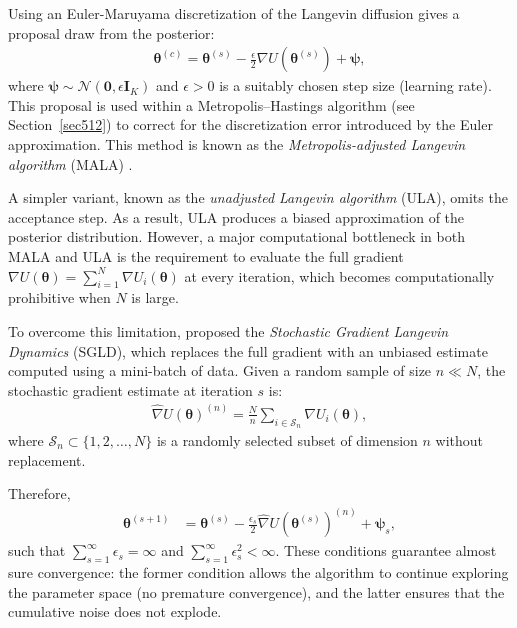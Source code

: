 Using an Euler-Maruyama discretization of the Langevin diffusion gives a proposal draw from the posterior:
\begin{align*}
	\boldsymbol{\theta}^{(c)} = \boldsymbol{\theta}^{(s)} - \frac{\epsilon}{2} \nabla U(\boldsymbol{\theta}^{(s)}) + \boldsymbol{\psi},
\end{align*}
where \( \boldsymbol{\psi} \sim \mathcal{N}(\mathbf{0}, \epsilon \mathbf{I}_K) \) and \( \epsilon > 0 \) is a suitably chosen step size (learning rate). This proposal is used within a Metropolis–Hastings algorithm (see Section~\ref{sec512}) to correct for the discretization error introduced by the Euler approximation. This method is known as the \textit{Metropolis-adjusted Langevin algorithm} (MALA) \cite{roberts1996exponential}. 

A simpler variant, known as the \textit{unadjusted Langevin algorithm} (ULA), omits the acceptance step. As a result, ULA produces a biased approximation of the posterior distribution. However, a major computational bottleneck in both MALA and ULA is the requirement to evaluate the full gradient \( \nabla U(\boldsymbol{\theta}) = \sum_{i=1}^N \nabla U_i(\boldsymbol{\theta}) \) at every iteration, which becomes computationally prohibitive when \( N \) is large.

To overcome this limitation, \cite{welling2011bayesian} proposed the \textit{Stochastic Gradient Langevin Dynamics} (SGLD), which replaces the full gradient with an unbiased estimate computed using a mini-batch of data. Given a random sample of size \( n \ll N \), the stochastic gradient estimate at iteration \( s \) is:
\begin{align} \label{eq:grad}
	\hat{\nabla} U(\boldsymbol{\theta})^{(n)} = \frac{N}{n} \sum_{i \in \mathcal{S}_n} \nabla U_i(\boldsymbol{\theta}),
\end{align}
where \( \mathcal{S}_n \subset \{1, 2, \dots, N\} \) is a randomly selected subset of dimension $n$ without replacement.

Therefore, 
\begin{align*}
	\boldsymbol{\theta}^{(s+1)}&= \boldsymbol{\theta}^{(s)} -\frac{\epsilon_s}{2}\hat{\nabla} U(\boldsymbol{\theta}^{(s)})^{(n)}+\boldsymbol{\psi}_s,
\end{align*}
such that $\sum_{s=1}^{\infty}\epsilon_s=\infty$ and $\sum_{s=1}^{\infty}\epsilon_s^2<\infty$. These conditions guarantee almost sure convergence: the former condition allows the algorithm to continue exploring the parameter space (no premature convergence), and the latter ensures that the cumulative noise does not explode.


